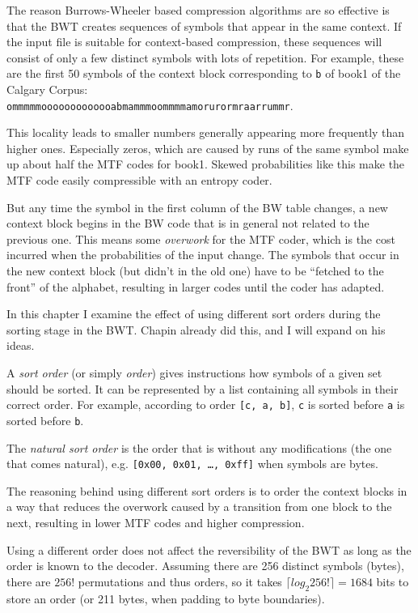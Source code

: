 \documentclass[a4paper]{scrreprt}
\begin{document}
The reason Burrows-Wheeler based compression algorithms are so effective is that
the BWT creates sequences of symbols that appear in the same context. If the
input file is suitable for context-based compression, these sequences will
consist of only a few distinct symbols with lots of repetition. For example,
these are the first 50 symbols of the context block corresponding to \texttt{b}
of book1 of the Calgary Corpus:\\
\texttt{ommmmmooooooooooooabmammmoommmmamorurormraarrummr}.

This locality leads to smaller numbers generally appearing more frequently than
higher ones. Especially zeros, which are caused by runs of the same symbol make
up about half the MTF codes for book1. Skewed probabilities like this make the
MTF code easily compressible with an entropy coder.

But any time the symbol in the first column of the BW table changes, a new
context block begins in the BW code that is in general not related to the
previous one. This means some \emph{overwork} for the MTF coder, which is the
cost incurred when the probabilities of the input
change\cite{bitner1979heuristics}. The symbols that occur in the new context
block (but didn't in the old one) have to be ``fetched to the front'' of the
alphabet, resulting in larger codes until the coder has adapted.

In this chapter I examine the effect of using different sort orders during the
sorting stage in the BWT. Chapin\cite{chapin1998sort,chapin2001diss} already did
this, and I will expand on his ideas.

A \emph{sort order} (or simply \emph{order}) gives instructions how symbols of a
given set should be sorted. It can be represented by a list containing all
symbols in their correct order. For example, according to order \texttt{[c, a,
b]}, \texttt{c} is sorted before \texttt{a} is sorted before \texttt{b}.

The \emph{natural sort order} is the order that is without any modifications
(the one that comes natural), e.g. \texttt{[0x00, 0x01, \ldots, 0xff]} when
symbols are bytes.

The reasoning behind using different sort orders is to order the context blocks
in a way that reduces the overwork caused by a transition from one block to the
next, resulting in lower MTF codes and higher compression.

Using a different order does not affect the reversibility of the BWT as long as
the order is known to the decoder. Assuming there are 256 distinct symbols
(bytes), there are \(256!\) permutations and thus orders, so it takes \(\lceil
log_{2}256! \rceil = 1684\) bits to store an order (or 211 bytes, when
padding to byte boundaries).
\end{document}
